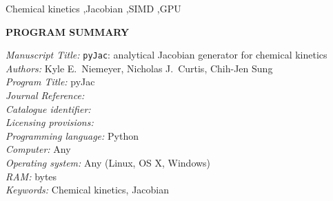 \documentclass[preprint,12pt]{elsarticle}
\newcounter{bla}
\begin{document}
\begin{frontmatter}
\begin{keyword}
Chemical kinetics \sep Jacobian \sep SIMD \sep GPU
\end{keyword}

\end{frontmatter}





{\bf PROGRAM SUMMARY}

\begin{small}
\noindent
{\em Manuscript Title:} \texttt{pyJac}: analytical Jacobian generator for chemical kinetics \\
{\em Authors:} Kyle E.\ Niemeyer, Nicholas J.\ Curtis, Chih-Jen Sung \\
{\em Program Title:} pyJac                                    \\
{\em Journal Reference:}                                      \\
{\em Catalogue identifier:}                                   \\
{\em Licensing provisions:}                                   \\
{\em Programming language:} Python                            \\
{\em Computer:} Any                                              \\
{\em Operating system:} Any (Linux, OS X, Windows)            \\
{\em RAM:} bytes                                              \\
{\em Keywords:} Chemical kinetics, Jacobian  \\

\end{small}
\end{document}
